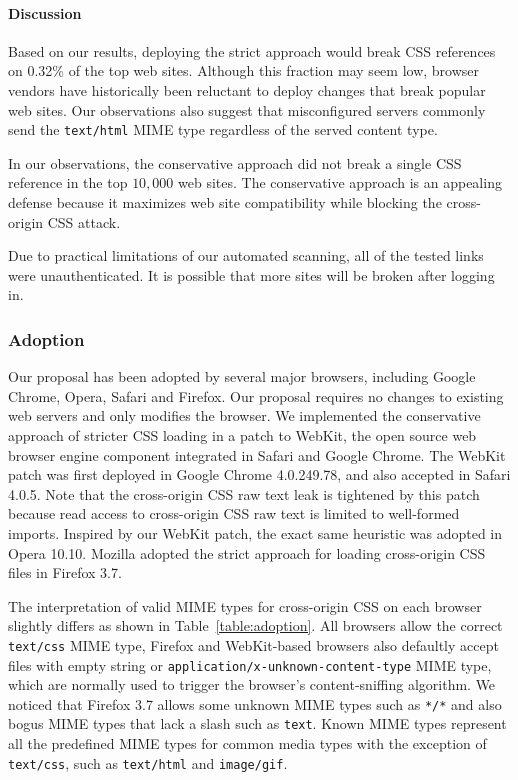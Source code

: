 \documentclass{acm_proc_article-sp}
\begin{document}
\paragraph{Discussion}
Based on our results, deploying the strict approach
would break CSS references on 0.32\% of the top web sites. Although this
fraction may seem low, browser vendors have historically been reluctant to
deploy changes that break popular web sites. Our observations also suggest that misconfigured servers commonly send the \texttt{text/html} MIME type
regardless of the served content type.

In our observations, the conservative approach did not break a single CSS reference in the top $10,000$ web sites. The conservative approach is an appealing defense because it maximizes web site compatibility while blocking the cross-origin CSS attack.

Due to practical limitations of our automated scanning, all of the tested links were unauthenticated. It is possible that more sites will be broken after logging in.

\subsubsection{Adoption}
Our proposal has been adopted by several major browsers, including Google Chrome, Opera, Safari and Firefox. Our proposal requires no changes to existing web servers and only modifies the browser. We implemented the conservative approach of stricter CSS loading in a patch to WebKit, the open source web browser engine component integrated in Safari and Google Chrome. The WebKit patch was first deployed in Google Chrome 4.0.249.78, and also accepted in Safari 4.0.5. Note that the cross-origin CSS raw text leak is tightened by this patch because read access to cross-origin CSS raw text is limited to well-formed imports. Inspired by our WebKit patch, the exact same heuristic was adopted in Opera 10.10. Mozilla adopted the strict approach for loading cross-origin CSS files in Firefox 3.7.

The interpretation of valid MIME types for cross-origin CSS on each browser slightly differs as shown in Table~\ref{table:adoption}. All browsers allow the correct \texttt{text/css} MIME type, Firefox and WebKit-based browsers also defaultly accept files with empty string or \texttt{application/x-unknown-content-type} MIME type, which are normally used to trigger the browser's content-sniffing algorithm. We noticed that Firefox 3.7 allows some unknown MIME types such as \texttt{*/*} and also bogus MIME types that lack a slash such as \texttt{text}. Known MIME types represent all the predefined MIME types for common media types with the exception of \texttt{text/css}, such as \texttt{text/html} and \texttt{image/gif}.
\end{document}
